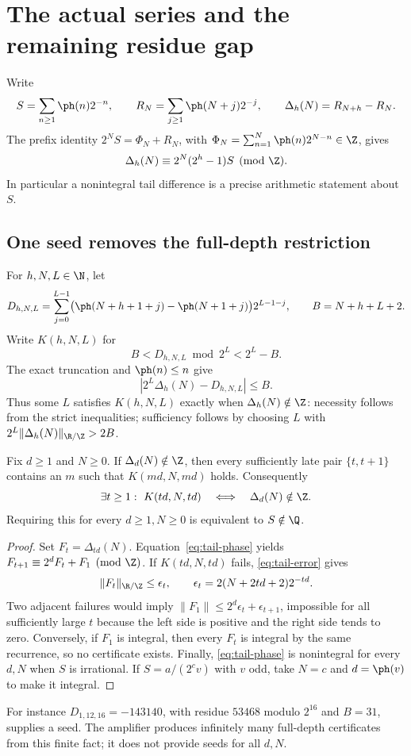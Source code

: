 \section{The actual series and the remaining residue gap}\label{sec:carry-rank}
Write
\[
 S=\sum_{n\ge1}\ph(n)2^{-n},\qquad
 R_N=\sum_{j\ge1}\ph(N+j)2^{-j},\qquad
 \Delta_h(N)=R_{N+h}-R_N.
\]
The prefix identity $2^NS=\Phi_N+R_N$, with
$\Phi_N=\sum_{n=1}^N\ph(n)2^{N-n}\in\Z$, gives
\begin{equation}\label{eq:tail-phase}
 \Delta_h(N)\equiv2^N(2^h-1)S\pmod\Z.
\end{equation}
In particular a nonintegral tail difference is a precise arithmetic
statement about $S$.

\subsection{One seed removes the full-depth restriction}
For $h,N,L\in\N$, let
\[
 D_{h,N,L}=\sum_{j=0}^{L-1}
   \bigl(\ph(N+h+1+j)-\ph(N+1+j)\bigr)2^{L-1-j},
 \qquad B=N+h+L+2.
\]
Write $K(h,N,L)$ for
\[
 B<D_{h,N,L}\bmod2^L<2^L-B.
\]
The exact truncation and $\ph(n)\le n$ give
\begin{equation}\label{eq:tail-error}
 |2^L\Delta_h(N)-D_{h,N,L}|\le B.
\end{equation}
Thus some $L$ satisfies $K(h,N,L)$ exactly when $\Delta_h(N)\notin\Z$:
necessity follows from the strict inequalities; sufficiency follows by
choosing $L$ with $2^L\|\Delta_h(N)\|_{\R/\Z}>2B$.

\begin{theorem}\label{res:fulldepth}
Fix $d\ge1$ and $N\ge0$. If $\Delta_d(N)\notin\Z$, then every sufficiently
late pair $\{t,t+1\}$ contains an $m$ such that $K(md,N,md)$ holds.
Consequently
\[
 \exists t\ge1:\ K(td,N,td)
 \quad\Longleftrightarrow\quad\Delta_d(N)\notin\Z.
\]
Requiring this for every $d\ge1,N\ge0$ is equivalent to $S\notin\Q$.
\end{theorem}
\begin{proof}
Set $F_t=\Delta_{td}(N)$. Equation~\eqref{eq:tail-phase} yields
$F_{t+1}\equiv2^dF_t+F_1\pmod\Z$. If $K(td,N,td)$ fails,
\eqref{eq:tail-error} gives
\[
 \|F_t\|_{\R/\Z}\le\epsilon_t,
 \qquad \epsilon_t=2(N+2td+2)2^{-td}.
\]
Two adjacent failures would imply
$\|F_1\|\le2^d\epsilon_t+\epsilon_{t+1}$, impossible for all sufficiently
large $t$ because the left side is positive and the right side tends to zero.
Conversely, if $F_1$ is integral, then every $F_t$ is integral by the same
recurrence, so no certificate exists. Finally, \eqref{eq:tail-phase} is
nonintegral for every $d,N$ when $S$ is irrational. If
$S=a/(2^cv)$ with $v$ odd, take $N=c$ and $d=\ph(v)$ to make it integral.
\end{proof}
For instance $D_{1,12,16}=-143140$, with residue $53468$ modulo $2^{16}$
and $B=31$, supplies a seed. The amplifier produces infinitely many
full-depth certificates from this finite fact; it does not provide seeds
for all $d,N$.


